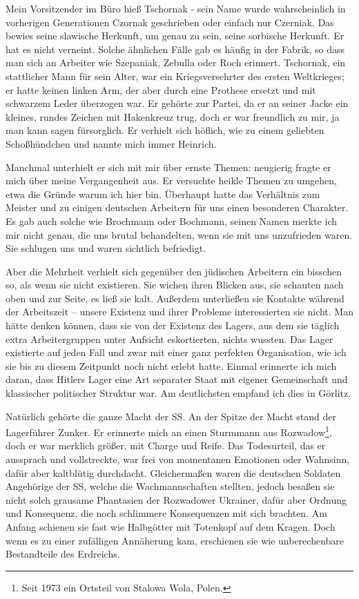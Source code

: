 \documentclass[a4paper,12pt,ngerman,
]{nisebook}
\begin{document}
Mein Vorsitzender im Büro hieß Tschornak - sein Name wurde wahrscheinlich in vorherigen Generationen Czornak geschrieben oder einfach nur Czerniak. 
Das bewies seine slawische Herkunft, um genau zu sein, seine sorbische Herkunft. Er hat es nicht verneint. Solche ähnlichen Fälle gab es häufig in der Fabrik, so dass man sich an Arbeiter wie Szepaniak, Zebulla oder Roch erinnert. Tschornak, ein stattlicher Mann für sein Alter, war ein Kriegsversehrter des ersten Weltkrieges; er hatte keinen linken Arm, der aber durch eine Prothese ersetzt und mit schwarzem Leder überzogen war.
Er gehörte zur Partei, da er an seiner Jacke ein kleines, rundes Zeichen mit Hakenkreuz trug, doch er war freundlich zu mir, ja man kann sagen fürsorglich. 
Er verhielt sich höflich, wie zu einem geliebten Schoßhündchen und nannte mich immer \glqq Heinrich\grqq.

Manchmal unterhielt er sich mit mir über ernste Themen: neugierig fragte er mich  über meine Vergangenheit aus. Er versuchte heikle Themen zu umgehen, etwa die Gründe warum ich hier bin. Überhaupt hatte das Verhältnis zum Meister und zu einigen deutschen Arbeitern  für uns einen besonderen Charakter. Es gab auch solche wie Brochmann oder Bochmann, seinen Namen merkte ich mir nicht genau, die uns brutal behandelten, wenn sie mit uns unzufrieden waren. Sie schlugen uns und waren sichtlich befriedigt.

Aber die Mehrheit verhielt sich gegenüber den jüdischen Arbeitern ein bisschen so, als wenn sie nicht existieren. Sie wichen ihren Blicken aus, sie schauten nach oben und zur Seite, es ließ sie kalt. Außerdem unterließen sie Kontakte während der Arbeitszeit -- unsere Existenz und ihrer Probleme interessierten sie nicht. 
Man hätte denken können, dass sie von der Existenz des Lagers, aus dem sie täglich extra Arbeitergruppen unter Aufsicht eskortierten, nichts wussten. Das Lager existierte auf jeden Fall und zwar mit einer ganz perfekten Organisation, wie ich sie bis zu diesem Zeitpunkt noch nicht erlebt hatte. Einmal erinnerte ich mich daran, dass Hitlers Lager eine Art separater Staat mit eigener Gemeinschaft und klassischer politischer Struktur war. Am deutlichsten empfand ich dies in Görlitz.

Natürlich gehörte die ganze Macht der SS. An der Spitze der Macht stand der Lagerführer Zunker. Er erinnerte mich an einen Sturmmann aus Rozwadow\footnote{Seit 1973 ein Ortsteil von Stalowa Wola, Polen.}, doch er war merklich größer, mit Charge und Reife. Das Todesurteil, das er aussprach und vollstreckte, war frei von momentanen Emotionen oder Wahnsinn, dafür aber kaltblütig durchdacht. Gleichermaßen waren die deutschen Soldaten Angehörige der SS, welche die Wachmannschaften stellten, jedoch besaßen sie nicht solch grausame Phantasien der Rozwadower Ukrainer, dafür aber Ordnung und Konsequenz, die noch schlimmere Konsequenzen mit sich brachten. Am Anfang schienen sie fast wie Halbgötter mit Totenkopf auf dem Kragen. Doch wenn es zu einer zufälligen Annäherung kam, erschienen sie wie unberechenbare Bestandteile des Erdreichs. 
\end{document}
